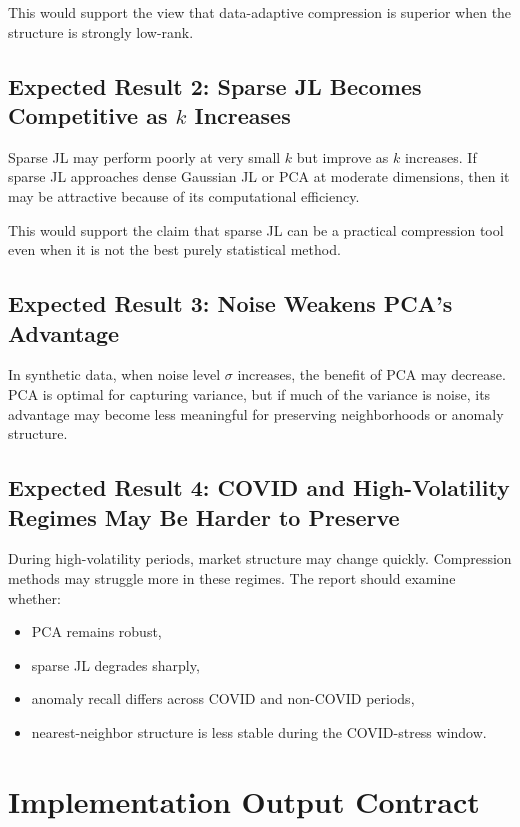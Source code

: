\documentclass[11pt]{article}
\begin{document}
This would support the view that data-adaptive compression is superior when the structure is strongly low-rank.

\subsection{Expected Result 2: Sparse JL Becomes Competitive as $k$ Increases}

Sparse JL may perform poorly at very small $k$ but improve as $k$ increases. If sparse JL approaches dense Gaussian JL or PCA at moderate dimensions, then it may be attractive because of its computational efficiency.

This would support the claim that sparse JL can be a practical compression tool even when it is not the best purely statistical method.

\subsection{Expected Result 3: Noise Weakens PCA's Advantage}

In synthetic data, when noise level $\sigma$ increases, the benefit of PCA may decrease. PCA is optimal for capturing variance, but if much of the variance is noise, its advantage may become less meaningful for preserving neighborhoods or anomaly structure.

\subsection{Expected Result 4: COVID and High-Volatility Regimes May Be Harder to Preserve}

During high-volatility periods, market structure may change quickly. Compression methods may struggle more in these regimes. The report should examine whether:

\begin{itemize}
    \item PCA remains robust,
    \item sparse JL degrades sharply,
    \item anomaly recall differs across COVID and non-COVID periods,
    \item nearest-neighbor structure is less stable during the COVID-stress window.
\end{itemize}

\section{Implementation Output Contract}
\end{document}

